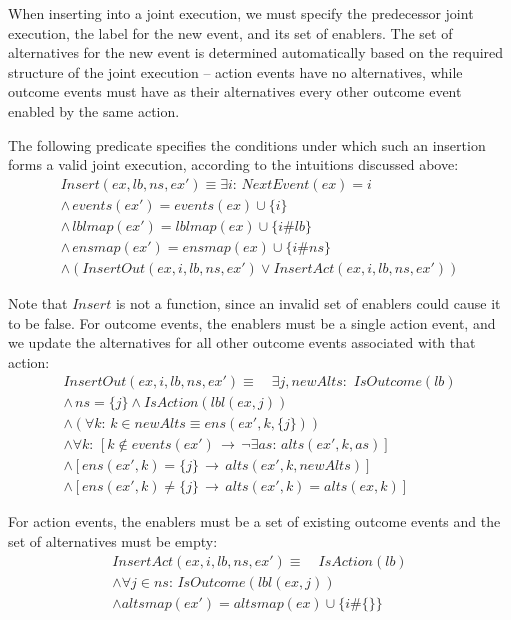 When inserting into a joint execution, we must specify the predecessor
joint execution, the label for the new event, and its set of enablers.
The set of alternatives for the new event is determined automatically
based on the required structure of the joint execution -- action events
have no alternatives, while outcome events must have as their alternatives
every other outcome event enabled by the same action.

The following predicate specifies the conditions under which such
an insertion forms a valid joint execution, according to the intuitions
discussed above:\begin{gather*}
Insert(ex,lb,ns,ex')\equiv\exists i:\, NextEvent(ex)=i\\
\wedge\, events(ex')=events(ex)\cup\{i\}\\
\wedge\, lblmap(ex')=lblmap(ex)\cup\{i\#lb\}\\
\wedge\, ensmap(ex')=ensmap(ex)\cup\{i\#ns\}\\
\wedge\left(InsertOut(ex,i,lb,ns,ex')\vee InsertAct(ex,i,lb,ns,ex')\right)\end{gather*}


Note that $Insert$ is not a function, since an invalid set of enablers
could cause it to be false. For outcome events, the enablers must
be a single action event, and we update the alternatives for all other
outcome events associated with that action:\begin{gather*}
InsertOut(ex,i,lb,ns,ex')\equiv\,\,\,\,\,\,\exists j,newAlts:\,\, IsOutcome(lb)\\
\wedge\, ns=\{j\}\wedge IsAction(lbl(ex,j))\\
\wedge\left(\forall k:\, k\in newAlts\equiv ens(ex',k,\{j\})\right)\\
\wedge\forall k:\,\left[k\not\in events(ex')\,\rightarrow\,\neg\exists as:\, alts(ex',k,as)\right]\\
\wedge\left[ens(ex',k)=\{j\}\,\rightarrow\, alts(ex',k,newAlts)\right]\\
\wedge\left[ens(ex',k)\neq\{j\}\,\rightarrow\, alts(ex',k)=alts(ex,k)\right]\end{gather*}


For action events, the enablers must be a set of existing outcome
events and the set of alternatives must be empty:\begin{gather*}
InsertAct(ex,i,lb,ns,ex')\equiv\,\,\,\,\,\, IsAction(lb)\\
\wedge\forall j\in ns:\, IsOutcome(lbl(ex,j))\\
\wedge altsmap(ex')=altsmap(ex)\cup\{i\#\{\}\}\end{gather*}


